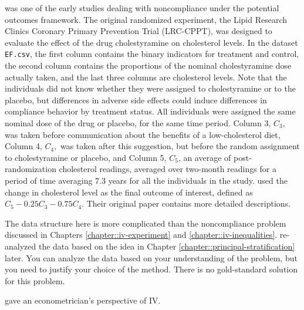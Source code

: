 \begin{HomeworkProblem}\label{exr:23-4}

\citet{efron1991compliance} was one of the early studies dealing with noncompliance under the potential outcomes framework. The original randomized experiment, the Lipid Research Clinics Coronary Primary Prevention Trial (LRC-CPPT), was designed to evaluate the effect of the drug cholestyramine on cholesterol levels.
In the dataset \texttt{EF.csv}, the first column contains the binary indicators for treatment and control, the second column contains the proportions of the nominal cholestyramine dose actually taken, and the last three columns are cholesterol levels.
Note that the individuals did not know whether they were assigned to cholestyramine or to the placebo, but differences in adverse side effects could induce differences in compliance behavior by treatment status. All individuals were assigned the same nominal dose of the drug or placebo, for the same time period.
Column 3, $C_3$, was taken before communication about the benefits of a low-cholesterol diet, Column 4, $C_4,$ was taken after this suggestion, but before the random assignment to cholestyramine or placebo, and Column 5, $C_5$,  an average of post-randomization cholesterol readings, averaged over two-month readings for a period of time averaging 7.3 years for all the individuals in the study. \citet{efron1991compliance} used the change in cholesterol level as the final outcome of interest, defined as $C_5 - 0.25C_3 - 0.75C_4$. Their original paper contains more detailed descriptions.


The data structure here is more complicated than the noncompliance problem discussed in Chapters \ref{chapter::iv-experiment} and \ref{chapter::iv-inequalities}.
\citet{jin2008principal} re-analyzed the data based on the idea in Chapter \ref{chapter::principal-stratification} later.
You can analyze the data based on your understanding of the problem, but you need to justify your choice of the method. There is no gold-standard solution for this problem.




\end{HomeworkProblem}

\begin{HomeworkProblem}\label{exr:23-5}


\citet{imbens2014instrumental} gave an econometrician's perspective of IV.


\end{HomeworkProblem}
